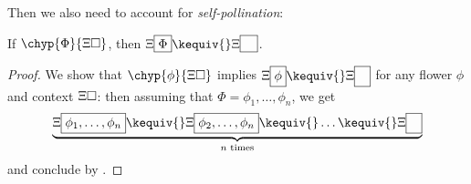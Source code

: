 Then we also need to account for \emph{self-pollination}:

\begin{lemma}[Pollination]
  
  If $\chyp{\Phi}{\Xi\hole}$, then $\Xi\select{\Phi} \kequiv{}
  \Xi\select{\phantom{\Phi}}$.
\end{lemma}
\begin{proof}
  We show that $\chyp{\phi}{\Xi\hole}$ implies $\Xi\select{\phi} \kequiv{}
  \Xi\select{\phantom{\phi}}$ for any flower $\phi$ and context $\Xi\square$: then
  assuming that $\Phi = \phi_1, \ldots, \phi_n$, we get
  $$\underbrace{\Xi\select{\phi_1, \ldots, \phi_n} \kequiv{} \Xi\select{\phi_2,
  \ldots, \phi_n} \kequiv{} \ldots \kequiv{} \Xi\select{\phantom{\phi}}}_{\text{$n$
  times}}$$ and conclude by .
  

\end{proof}
